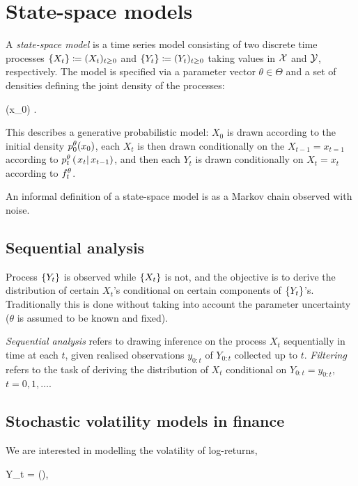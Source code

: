 \section{State-space models}

A \textit{state-space model} is a time series model consisting of two discrete time processes $\left\{X_t\right\} \coloneqq (X_{t})_{t \geq 0}$ and $\left\{Y_t\right\} \coloneqq (Y_{t})_{t \geq 0}$ taking values in $\mathcal{X}$ and $\mathcal{Y}$, respectively. The model is specified via a parameter vector $\theta \in \Theta$ and a set of densities defining the joint density of the processes:

\beq
   (x_0)      .
\eeq

This describes a generative probabilistic model: $X_0$ is drawn according to the initial density $p_{0}^\theta(x_0)$, each $X_t$ is then drawn conditionally on the $X_{t-1} = x_{t=1}$ according to $p_{t}^\theta\left(\left. x_t \right| x_{t-1} \right)$, and then each $Y_t$ is drawn conditionally on $X_t = x_t$ according to $f_{t}^\theta$.

An informal definition of a state-space model is as a Markov chain observed with noise.

\subsection{Sequential analysis}

Process $\left\{Y_t\right\}$ is observed while $\left\{X_t\right\}$ is not, and the objective is to derive the distribution of certain $X_t$'s conditional on certain components of $\left\{Y_t\right\}$'s. Traditionally this is done without taking into account the parameter uncertainty ($\theta$ is assumed to be known and fixed).

\textit{Sequential analysis} refers to drawing inference on the process $X_t$ sequentially in time at each $t$, given realised observations $y_{0:t}$ of $Y_{0:t}$ collected up to $t$. \textit{Filtering} refers to the task of deriving the distribution of $X_t$ conditional on $Y_{0:t} = y_{0:t}$, $t=0,1,\dots$.

\subsection{Stochastic volatility models in finance}

We are interested in modelling the volatility of log-returns,

\beq
  Y_t = \log \left(\right),
\eeq

